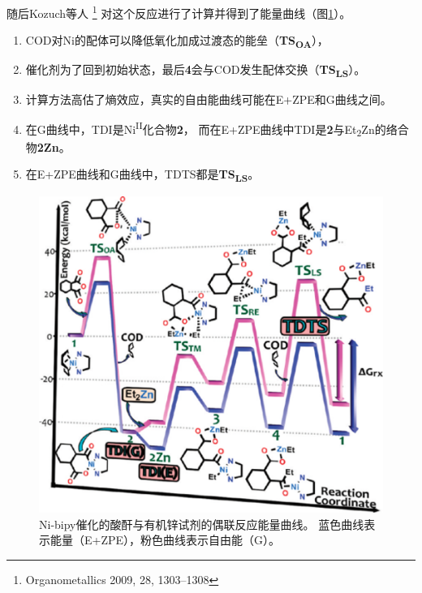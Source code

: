 \documentclass[a4paper,titlepage]{article}
\begin{document}
随后Kozuch等人
\footnote{\label{paper:TOF_withConcentration}Organometallics 2009, 28, 1303–1308}
对这个反应进行了计算并得到了能量曲线（图\ref{fig:Ni_profile}）。
\begin{enumerate}
  \item COD对Ni的配体可以降低氧化加成过渡态的能垒（\textbf{TS\textsubscript{OA}}），
  \item 催化剂为了回到初始状态，最后\textbf{4}会与COD发生配体交换（\textbf{TS\textsubscript{LS}}）。
  \item 计算方法高估了熵效应，真实的自由能曲线可能在E+ZPE和G曲线之间。
  \item 在G曲线中，TDI是Ni\textsuperscript{II}化合物\textbf{2}，
        而在E+ZPE曲线中TDI是\textbf{2}与Et\textsubscript{2}Zn的络合物\textbf{2Zn}。
  \item 在E+ZPE曲线和G曲线中，TDTS都是\textbf{TS\textsubscript{LS}}。
\end{enumerate}
\begin{figure}[H]  %
  \centering
  \includegraphics[scale=0.5]{Ni_profile}
  \caption{Ni-bipy催化的酸酐与有机锌试剂的偶联反应能量曲线。
          蓝色曲线表示能量（E+ZPE），粉色曲线表示自由能（G）。}
  \label{fig:Ni_profile}  %
\end{figure}
\end{document}
